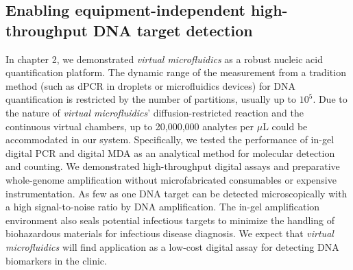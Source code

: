 \subsection{Enabling equipment-independent high-throughput DNA target detection}
In chapter 2, we demonstrated \textit{virtual microfluidics} as a robust nucleic acid quantification platform. The dynamic range of the measurement from a tradition method (such as dPCR in droplets or microfluidics devices) for DNA quantification is restricted by the number of partitions, usually up to $10^5$. Due to the nature of \textit{virtual microfluidics}' diffusion-restricted reaction and the continuous virtual chambers, up to 20,000,000 analytes per $\mu$L could be accommodated in our system. Specifically, we tested the performance of in-gel digital PCR and digital MDA as an analytical method for molecular detection and counting. We demonstrated high-throughput digital assays and preparative whole-genome amplification without microfabricated consumables or expensive instrumentation. As few as one DNA target can be detected microscopically with a high signal-to-noise ratio by DNA amplification. The in-gel amplification environment also seals potential infectious targets to minimize the handling of biohazardous materials for infectious disease diagnosis. We expect that \textit{virtual microfluidics} will find application as a low-cost digital assay for detecting DNA biomarkers in the clinic. 

